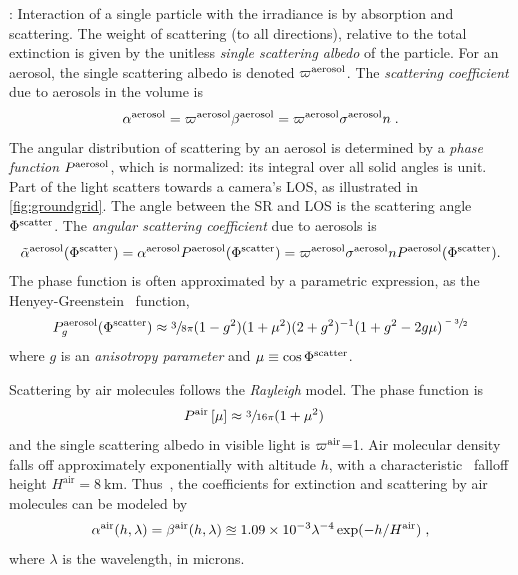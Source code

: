 \documentclass[10pt,letterpaper]{article}
\begin{document}
: Interaction of a single particle with the
irradiance is by absorption and scattering. The weight of scattering
(to all directions), relative to the total extinction is given by the
unitless {\em single scattering albedo} of the particle. For an
aerosol, the single scattering albedo is denoted $\varpi^{\rm
  aerosol}$.  The {\em scattering coefficient} due to aerosols in the
volume is
\begin{align}
  \alpha^{\rm aerosol}= \varpi^{\rm aerosol}\beta^{\rm aerosol}
  =\varpi^{\rm aerosol} \sigma^{\rm aerosol} n \;.
  \label{eq:alph}
\end{align}
The angular distribution of scattering by an aerosol is determined by
a {\em phase function} $P^{\rm aerosol}$, which is normalized: its
integral over all solid angles is unit. Part of the light scatters
towards a camera's LOS, as illustrated in \cref{fig:groundgrid}. The
angle between the SR and LOS is the scattering angle $\Phi^{\rm
  scatter}$. The {\em angular scattering coefficient} due to aerosols
is
\begin{align}
  \tilde\alpha^{\rm aerosol}(\Phi^{\rm scatter}) = \alpha^{\rm
    aerosol} P^{\rm aerosol}(\Phi^{\rm scatter}) = \varpi^{\rm
    aerosol} \sigma^{\rm aerosol} n P^{\rm aerosol}(\Phi^{\rm
    scatter}).
  \label{eq:alphabasic}
\end{align}
The phase function is often approximated by a parametric expression,
as the Henyey-Greenstein~\cite{Cornette1995} function,
\begin{align}
  P^{\rm aerosol}_g(\Phi^{\rm scatter})\approx \sfrac{3}{8\pi} (1 -
  g^2)(1+\mu^2) (2+g^2)^{-1}(1 + g^2 - 2g\mu)^{\sfrac{-3}{2}}
  \label{eq:aerosol_scatter}
\end{align}
where $g$ is an {\em anisotropy parameter} and $\mu\equiv \cos
\Phi^{\rm scatter}$.


Scattering by air molecules follows the {\em Rayleigh} model. The
phase function is
\begin{align}
  P^{\rm air}\left[\mu\right] &\approx \sfrac{3}{16\pi}(1+\mu^2)
  \label{eq:rayleighP}
\end{align}
and the single scattering albedo in visible light is $\varpi^{\rm
  air}$=1. Air molecular density falls off approximately exponentially
with altitude $h$, with a characteristic~\cite{Levi1980} falloff
height $H^\mathrm{air}=8\ \si{\km}$. Thus~\cite{Levi1980}, the
coefficients for extinction and scattering by air molecules can be
modeled by
\begin{align}
  \alpha^{\rm air}(h, \lambda)=\beta^{\rm air}(h, \lambda) \approxeq
  1.09 \times 10^{-3}\lambda^{-4} \exp(-h/H^\mathrm{air})
  \;,%
  \label{eq:rayleighbeta}
\end{align}
where $\lambda$ is the wavelength, in microns.
\\
\end{document}
